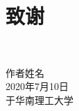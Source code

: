\chapter{致\texorpdfstring{\quad}{}谢}


~\\

\begin{minipage}[t]{0.945\textwidth}%
	\begin{flushright}
		作者姓名\\
		2020年7月10日\\	%
		于华南理工大学
		\par\end{flushright}
\end{minipage}

